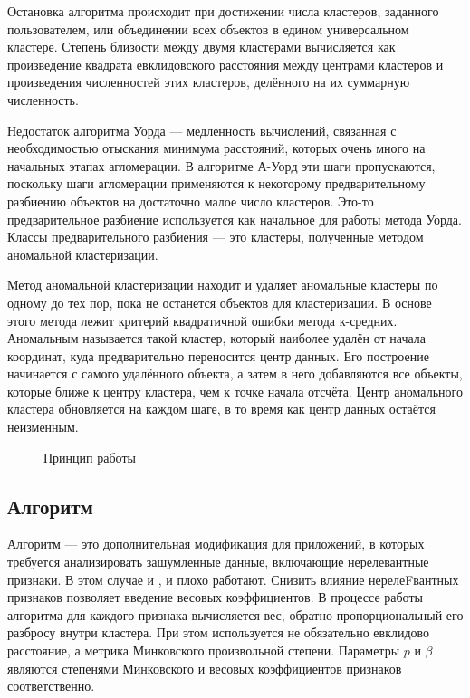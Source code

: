 \documentclass[12pt,tikz]{instruction}
\begin{document}
Остановка алгоритма происходит при достижении числа кластеров, заданного пользователем, или объединении всех объектов в едином универсальном кластере. Степень близости между двумя кластерами вычисляется как произведение квадрата евклидовского расстояния между центрами кластеров и произведения численностей этих кластеров, делённого на их суммарную численность. 

Недостаток алгоритма Уорда --- медленность вычислений, связанная с необходимостью отыскания минимума расстояний, которых очень много на начальных этапах агломерации. В алгоритме А-Уорд эти шаги пропускаются, поскольку шаги агломерации применяются к некоторому предварительному разбиению объектов на достаточно малое число кластеров. Это-то предварительное разбиение используется как начальное для работы метода Уорда. Классы предварительного разбиения --- это кластеры, полученные методом аномальной кластеризации.

Метод аномальной кластеризации находит и удаляет аномальные кластеры по одному до тех пор, пока не останется объектов для кластеризации. В основе этого метода лежит критерий квадратичной ошибки метода к-средних. Аномальным называется такой кластер, который наиболее удалён от начала координат, куда предварительно переносится центр данных. Его построение начинается с самого удалённого объекта, а затем в него добавляются все объекты, которые ближе к центру кластера, чем к точке начала отсчёта. Центр аномального кластера обновляется на каждом шаге, в то время как центр данных остаётся неизменным.

\begin{figure} %
	\centering
	\subfigure[]{\label{fig:ward1}}
	\subfigure[]{\label{fig:ward2}}
	\subfigure[]{\label{fig:ward3}}
	\subfigure[]{\label{fig:ward4}}
	\subfigure[]{\label{fig:ward5}}
	\subfigure[]{\label{fig:ward6}}
	\caption{Принцип работы \AWard}
	\label{fig:ward-working}
\end{figure}




\subsection{Алгоритм  \AWardpb}
Алгоритм \AWardpb --- это дополнительная модификация для приложений, в которых требуется анализировать зашумленные данные, включающие нерелевантные признаки. В этом случае и \Ward, и \AWard плохо работают. Снизить влияние нерелеFвантных признаков позволяет введение весовых коэффициентов. В процессе работы алгоритма \AWardpb для каждого признака вычисляется вес, обратно пропорциональный его разбросу  внутри кластера. При этом используется не обязательно евклидово расстояние, а метрика Минковского произвольной степени. Параметры $ p $ и  $ \beta $ являются степенями Минковского и 
весовых коэффициентов признаков соответственно.
\end{document}
